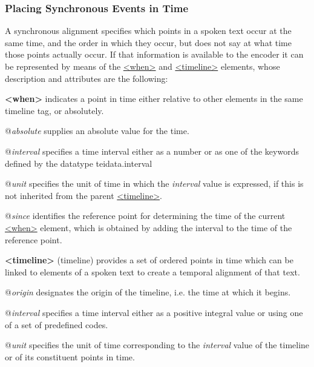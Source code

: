 \subsubsection[{Placing Synchronous Events in Time}]{Placing Synchronous Events in Time}\label{SASYMP}\par
A synchronous alignment specifies which points in a spoken text occur at the same time, and the order in which they occur, but does not say at what time those points actually occur. If that information is available to the encoder it can be represented by means of the \hyperref[TEI.when]{<when>} and \hyperref[TEI.timeline]{<timeline>} elements, whose description and attributes are the following: 
\begin{sansreflist}
  
\item [\textbf{<when>}] indicates a point in time either relative to other elements in the same timeline tag, or absolutely.\hfil\\[-10pt]\begin{sansreflist}
    \item[@{\itshape absolute}]
  supplies an absolute value for the time.
    \item[@{\itshape interval}]
  specifies a time interval either as a number or as one of the keywords defined by the datatype \textsf{teidata.interval}
    \item[@{\itshape unit}]
  specifies the unit of time in which the {\itshape interval} value is expressed, if this is not inherited from the parent \hyperref[TEI.timeline]{<timeline>}.
    \item[@{\itshape since}]
  identifies the reference point for determining the time of the current \hyperref[TEI.when]{<when>} element, which is obtained by adding the interval to the time of the reference point.
\end{sansreflist}  
\item [\textbf{<timeline>}] (timeline) provides a set of ordered points in time which can be linked to elements of a spoken text to create a temporal alignment of that text.\hfil\\[-10pt]\begin{sansreflist}
    \item[@{\itshape origin}]
  designates the origin of the timeline, i.e. the time at which it begins.
    \item[@{\itshape interval}]
  specifies a time interval either as a positive integral value or using one of a set of predefined codes.
    \item[@{\itshape unit}]
  specifies the unit of time corresponding to the {\itshape interval} value of the timeline or of its constituent points in time.
\end{sansreflist}  
\end{sansreflist}
